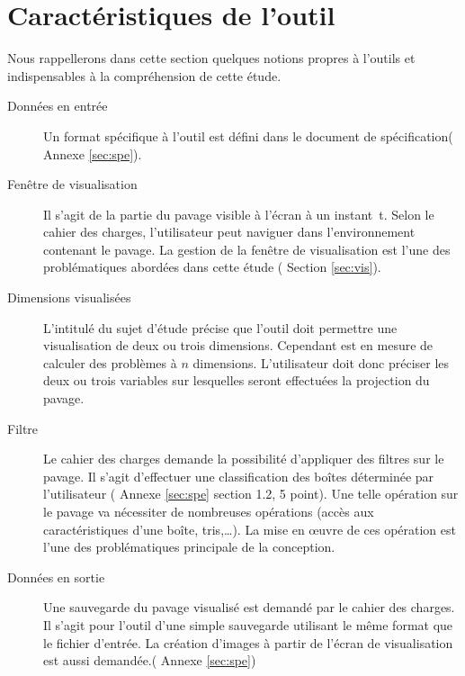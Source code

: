 \section{Caractéristiques de l'outil}
Nous rappellerons dans cette section quelques notions propres à l'outils et indispensables à la compréhension de cette étude.  
\begin{description}
\item[Données en entrée] Un format spécifique à l'outil est défini dans le document de spécification(\cf{} Annexe \ref{sec:spe}).
 \item[Fenêtre de visualisation] Il s'agit de la partie du pavage visible à l'écran à un instant~t. Selon le cahier des charges, l'utilisateur peut \og naviguer\fg{} dans l'environnement contenant le pavage. La gestion de la fenêtre de visualisation est l'une des problématiques abordées dans cette étude (\cf{} Section \ref{sec:vis}).
\item[Dimensions visualisées] L'intitulé du sujet d'étude précise que l'outil doit permettre une visualisation de deux ou trois dimensions. Cependant \realpaver{} est en mesure de calculer des problèmes à $n$ dimensions. L'utilisateur doit donc préciser les deux ou trois variables sur lesquelles seront effectuées la projection du pavage.  
\item[Filtre] Le cahier des charges demande la possibilité d'appliquer des filtres sur le pavage. Il s'agit d'effectuer une classification des boîtes déterminée par l'utilisateur (\cf{} Annexe \ref{sec:spe} section 1.2, 5 point). Une telle opération sur le pavage va nécessiter de nombreuses opérations (accès aux caractéristiques d'une boîte, tris,\dots). La mise en œuvre de ces opération est l'une des problématiques principale de la conception.    
\item[Données en sortie] Une sauvegarde du pavage visualisé est demandé par le cahier des charges. Il s'agit pour l'outil d'une simple \og sauvegarde \fg{} utilisant le même format que le fichier d'entrée. La création d'images à partir de l'écran de visualisation est aussi demandée.(\cf{} Annexe \ref{sec:spe})
\end{description}
